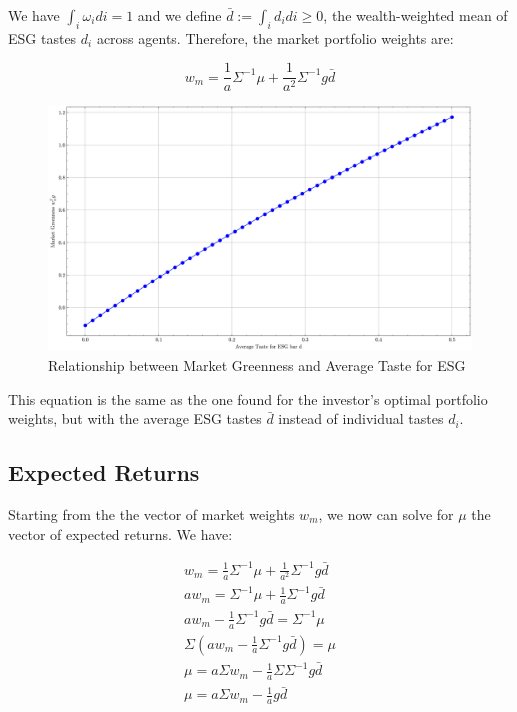 We have $\int_i \omega_i di = 1$ and we define $\bar{d} := \int_i d_i di \geq 0$,
the wealth-weighted mean of ESG tastes $d_i$ across agents. Therefore,
the market portfolio weights are:

\begin{equation}
    w_m = \frac{1}{a} \Sigma^{-1} \mu + \frac{1}{a^2} \Sigma^{-1} g \bar{d}
\end{equation}


\begin{figure}
    \centering
    \includegraphics[width=1\textwidth]{../images/chapter02/market_greenness_vs_average_esg_taste.png}
    \caption{Relationship between Market Greenness and Average Taste for ESG}
    \label{fig:esg_taste_market}
\end{figure}

This equation is the same as the one found 
for the investor's optimal portfolio weights, but with the
average ESG tastes $\bar{d}$ instead of individual tastes $d_i$.

\subsection{Expected Returns}

Starting from the the vector of market weights $w_m$, we now can 
solve for $\mu$ the vector of expected returns. We have:

\begin{equation}
    \begin{aligned}
    w_m = \frac{1}{a} \Sigma^{-1} \mu + \frac{1}{a^2} \Sigma^{-1} g \bar{d} \\
    a w_m = \Sigma^{-1} \mu + \frac{1}{a} \Sigma^{-1} g \bar{d} \\
    a w_m - \frac{1}{a} \Sigma^{-1} g \bar{d} = \Sigma^{-1} \mu \\
    \Sigma (a w_m - \frac{1}{a} \Sigma^{-1} g \bar{d}) = \mu \\ 
    \mu = a \Sigma w_m - \frac{1}{a} \Sigma \Sigma^{-1} g \bar{d} \\
    \mu = a \Sigma w_m - \frac{1}{a} g \bar{d}
    \end{aligned}
\end{equation}

